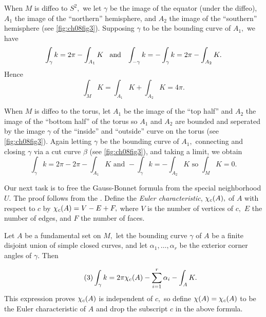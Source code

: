 \documentclass[../main]{subfiles}
\begin{document}
When $M$ is diffeo to $S^2,$ we let $\gamma$ be the image of the equator (under the diffeo), $A_1$ the image of the ``northern'' hemisphere, and $A_2$ the image of the ``southern'' hemisphere (see \ref{fig:ch08fig3}). Supposing $\gamma$ to be the bounding curve of $A_1,$ we have 
\[\int_{\gamma}k=2\pi-\int_{A_1}K \hspace{3 mm} \text{and} \hspace{3 mm} \int_{-\gamma}k=-\int_{\gamma}k=2\pi-\int_{A_2}K.\]
Hence \[\int_{M}K=\int_{A_1}K+\int_{A_2}K=4\pi.\]

When $M$ is diffeo to the torus, let $A_1$ be the image of the ``top half'' and $A_2$ the image of the ``bottom half'' of the torus so $A_1$ and $A_2$ are bounded and seperated by the image $\gamma$ of the ``inside'' and ``outside'' curve on the torus (see \ref{fig:ch08fig3}). Again letting $\gamma$ be the bounding curve of $A_1,$ connecting and closing $\gamma$ via a cut curve $\beta$ (see \ref{fig:ch08fig3}), and taking a limit, we obtain \[\int_{\gamma}k=2\pi-2\pi-\int_{A_1}K\text{ and } -\int_{\gamma}k=-\int_{A_2}K\text{ so }\int_{M}K=0.\]

Our next task is to free the Gauss-Bonnet formula from the special neighborhood $U.$ The proof follows from the \cite{samelson1955differential}. Define the \emph{Euler characteristic}, $\chi_c(A),$ of $A$ with respect to $c$ by $\chi_c(A)=V-E+F,$ where $V$ is the number of vertices of $c,$ $E$ the number of edges, and $F$ the number of faces.



\begin{theorem} \label{thm:ch8.1.4}
Let $A$ be a fundamental set on $M,$ let the bounding curve $\gamma$ of $A$ be a finite disjoint union of simple closed curves, and let $\alpha_1,\ldots,\alpha_r$ be the exterior corner angles of $\gamma.$ Then

\begin{equation}\tag{3}\label{eq:ch08.3}
\int_{\gamma}k=2\pi\chi_c(A)-\sum_{i=1}^r \alpha_i-\int_{A}K.
\end{equation} This expression proves $\chi_c(A)$ is independent of $c,$ so define $\chi(A)=\chi_c(A)$ to be the Euler characteristic of $A$ and drop the subscript $c$ in the above formula.
\end{theorem}
\end{document}
